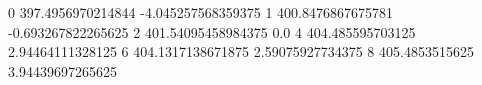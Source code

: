 0 397.4956970214844 -4.045257568359375
1 400.8476867675781 -0.693267822265625
2 401.54095458984375 0.0
4 404.485595703125 2.94464111328125
6 404.1317138671875 2.59075927734375
8 405.4853515625 3.94439697265625
